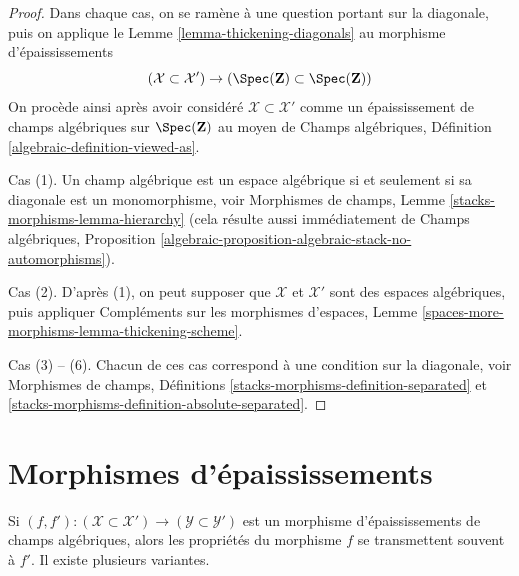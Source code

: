 \begin{proof}
Dans chaque cas, on se ramène à une question portant sur la diagonale, puis
on applique le Lemme \ref{lemma-thickening-diagonals} au
morphisme d'épaississements
$$
(\mathcal{X} \subset \mathcal{X}') \to
\left(\Spec(\mathbf{Z}) \subset \Spec(\mathbf{Z})\right)
$$
On procède ainsi après avoir considéré
$\mathcal{X} \subset \mathcal{X}'$ comme un épaississement de champs algébriques
sur $\Spec(\mathbf{Z})$ au moyen de
Champs algébriques, Définition \ref{algebraic-definition-viewed-as}.

\medskip\noindent
Cas (1). Un champ algébrique est un espace algébrique si et seulement si sa
diagonale est un monomorphisme, voir
Morphismes de champs, Lemme \ref{stacks-morphisms-lemma-hierarchy}
(cela résulte aussi immédiatement de Champs algébriques,
Proposition \ref{algebraic-proposition-algebraic-stack-no-automorphisms}).

\medskip\noindent
Cas (2). D'après (1), on peut supposer que $\mathcal{X}$ et $\mathcal{X}'$
sont des espaces algébriques, puis appliquer
Compléments sur les morphismes d'espaces, Lemme
\ref{spaces-more-morphisms-lemma-thickening-scheme}.

\medskip\noindent
Cas (3) -- (6). Chacun de ces cas correspond à une condition
sur la diagonale, voir Morphismes de champs, Définitions
\ref{stacks-morphisms-definition-separated} et
\ref{stacks-morphisms-definition-absolute-separated}.
\end{proof}









\section{Morphismes d'épaississements}
\label{section-morphisms-thickenings}

\noindent
Si $(f, f') : (\mathcal{X} \subset \mathcal{X}') \to
(\mathcal{Y} \subset \mathcal{Y}')$ est un morphisme
d'épaississements de champs algébriques, alors les propriétés du morphisme
$f$ se transmettent souvent à $f'$. Il existe plusieurs variantes.

